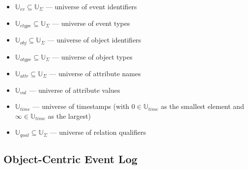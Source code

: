 \begin{itemize}
    \item $\mathbb{U}_{ev} \subseteq \mathbb{U}_\Sigma$ --- universe of event identifiers
    \item $\mathbb{U}_{etype} \subseteq \mathbb{U}_\Sigma$ --- universe of event types
    \item $\mathbb{U}_{obj} \subseteq \mathbb{U}_\Sigma$ --- universe of object identifiers
    \item $\mathbb{U}_{otype} \subseteq \mathbb{U}_\Sigma$ --- universe of object types
    \item $\mathbb{U}_{attr} \subseteq \mathbb{U}_\Sigma$ --- universe of attribute names
    \item $\mathbb{U}_{val}$ --- universe of attribute values
    \item $\mathbb{U}_{time}$ --- universe of timestamps (with $0 \in \mathbb{U}_{time}$ as the smallest element and $\infty \in \mathbb{U}_{time}$ as the largest)
    \item $\mathbb{U}_{qual} \subseteq \mathbb{U}_\Sigma$ --- universe of relation qualifiers
\end{itemize}

\subsection{Object-Centric Event Log}

